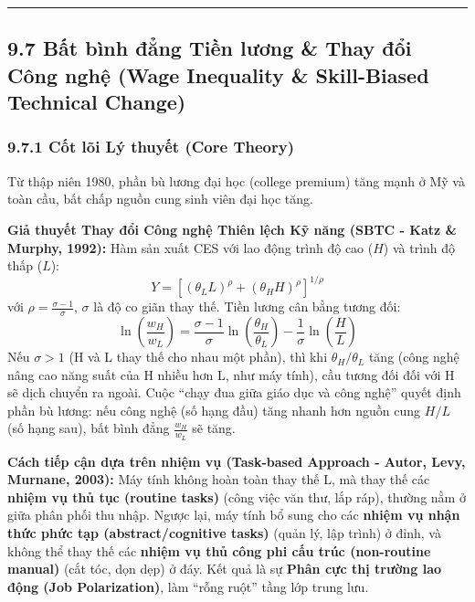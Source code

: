 \documentclass[
]{article}
\begin{document}
\begin{center}\rule{0.5\linewidth}{0.5pt}\end{center}

\subsection{9.7 Bất bình đẳng Tiền lương \& Thay đổi Công nghệ (Wage
Inequality \& Skill-Biased Technical
Change)}\label{bux1ea5t-buxecnh-ux111ux1eb3ng-tiux1ec1n-lux1b0ux1a1ng-thay-ux111ux1ed5i-cuxf4ng-nghux1ec7-wage-inequality-skill-biased-technical-change}

\subsubsection{9.7.1 Cốt lõi Lý thuyết (Core
Theory)}\label{cux1ed1t-luxf5i-luxfd-thuyux1ebft-core-theory-38}

Từ thập niên 1980, phần bù lương đại học (college premium) tăng mạnh ở
Mỹ và toàn cầu, bất chấp nguồn cung sinh viên đại học tăng.

\textbf{Giả thuyết Thay đổi Công nghệ Thiên lệch Kỹ năng (SBTC - Katz \&
Murphy, 1992):} Hàm sản xuất CES với lao động trình độ cao (\(H\)) và
trình độ thấp (\(L\)):
\[ Y = \left[ (\theta_L L)^\rho + (\theta_H H)^\rho \right]^{1/\rho} \]
với \(\rho = \frac{\sigma - 1}{\sigma}\), \(\sigma\) là độ co giãn thay
thế. Tiền lương cân bằng tương đối:
\[ \ln\left(\frac{w_H}{w_L}\right) = \frac{\sigma - 1}{\sigma} \ln\left(\frac{\theta_H}{\theta_L}\right) - \frac{1}{\sigma} \ln\left(\frac{H}{L}\right) \]
Nếu \(\sigma > 1\) (H và L thay thế cho nhau một phần), thì khi
\(\theta_H / \theta_L\) tăng (công nghệ nâng cao năng suất của H nhiều
hơn L, như máy tính), cầu tương đối đối với H sẽ dịch chuyển ra ngoài.
Cuộc ``chạy đua giữa giáo dục và công nghệ'' quyết định phần bù lương:
nếu công nghệ (số hạng đầu) tăng nhanh hơn nguồn cung \(H/L\) (số hạng
sau), bất bình đẳng \(\frac{w_H}{w_L}\) sẽ tăng.

\textbf{Cách tiếp cận dựa trên nhiệm vụ (Task-based Approach - Autor,
Levy, Murnane, 2003):} Máy tính không hoàn toàn thay thế L, mà thay thế
các \textbf{nhiệm vụ thủ tục (routine tasks)} (công việc văn thư, lắp
ráp), thường nằm ở giữa phân phối thu nhập. Ngược lại, máy tính bổ sung
cho các \textbf{nhiệm vụ nhận thức phức tạp (abstract/cognitive tasks)}
(quản lý, lập trình) ở đỉnh, và không thể thay thế các \textbf{nhiệm vụ
thủ công phi cấu trúc (non-routine manual)} (cắt tóc, dọn dẹp) ở đáy.
Kết quả là sự \textbf{Phân cực thị trường lao động (Job Polarization)},
làm ``rỗng ruột'' tầng lớp trung lưu.
\end{document}
